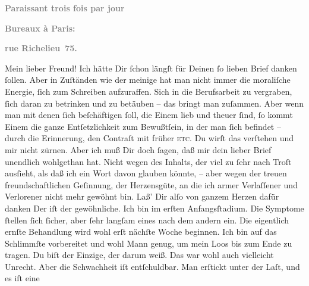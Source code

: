 \begin{ledgroupsized}[t]{13cm}
           \pstart
           \begin{otherlanguage}{french}\textcolor{gray}{\textbf{\textbf{Paraissant trois fois par jour}}}\end{otherlanguage}\pend
           \pstart
           \begin{otherlanguage}{french}\textcolor{gray}{\textbf{\textbf{Bureaux à Paris:}}}\end{otherlanguage}\pend
           \pstart
           \begin{otherlanguage}{french}\textcolor{gray}{\textbf{\textbf{rue Richelieu 75.}}}\end{otherlanguage}\pend
           \pstart
           Mein lieber Freund!\pend
           \pstart
           Ich hätte Dir ſchon längſt für Deinen ſo lieben Brief danken ſollen. Aber in
               Zuſtänden wie der meinige hat man nicht immer die moraliſche Energie, ſich zum
               Schreiben aufzuraffen. Sich in die Berufsarbeit zu vergraben, ſich daran zu betrinken
               und zu betäuben – das bringt man zuſammen. Aber wenn man mit denen ſich beſchäftigen
               ſoll, die Einem lieb und theuer ſind, ſo kommt Einem die ganze Entſetzlichkeit zum
               Bewußtſein, in der man ſich befindet – durch die Erin{\pb}nerung, den Contraſt mit früher \textsc{etc}. Du wirſt das
               verſtehen und mir nicht zürnen.\pend
           \pstart
           Aber ich muß Dir doch ſagen, daß mir dein lieber Brief unendlich wohlgethan hat.
               Nicht wegen des Inhalts, der viel zu ſehr nach Troſt ausſieht, als daß ich ein Wort
               davon glauben könnte, – aber wegen der treuen freundschaftlichen Geſinnung, der
               Herzensgüte, an die ich armer Verlaſſener und Verlorener nicht mehr gewöhnt bin. Laß’
               Dir alſo von ganzem Herzen dafür danken{\dotsfour}\pend
           \pstart
           Der \label{K_L02705-1v}\label{K_L02705-1h} iſt der gewöhnliche. Ich bin im erſten Anfangsſtadium. Die Symptome ſtellen
               ſich ſicher, aber ſehr langſam eines nach dem {\pb}andern ein. Die eigentlich ernſte Behandlung wird wohl erſt nächſte Woche beginnen.
               Ich bin auf das Schlimmſte vorbereitet und wohl Mann genug, um mein Loos bis zum Ende
               zu tragen. Du biſt der Einzige, der darum weiß. Das war wohl auch vielleicht Unrecht.
               Aber die Schwachheit iſt entſchuldbar. Man erſtickt unter der Laſt, und es iſt eine

\end{ledgroupsized}
